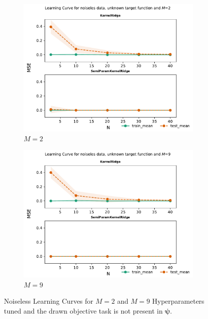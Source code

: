 \documentclass{tran-l}
\theoremstyle{definition}
\theoremstyle{remark}
\numberwithin{equation}{section}
\begin{document}
\begin{figure}[h!]
   \centering
   \begin{subfigure}[b]{0.45\textwidth}
     \centering
     \includegraphics[width=\textwidth]{Figures/unknownnoiseless/learningcurve2}
     \caption{$M=2$}
   \end{subfigure}
   \hfill
   \begin{subfigure}[b]{0.45\textwidth}
     \centering
     \includegraphics[width=\textwidth]{Figures/unknownnoiseless/learningcurve9}
     \caption{$M=9$}
   \end{subfigure}
   \caption{Noiseless Learning Curves for $M=2$ and $M=9$ Hyperparameters tuned and the drawn objective task is not present in $\boldsymbol{\psi}$.}
\end{figure}
\end{document}
